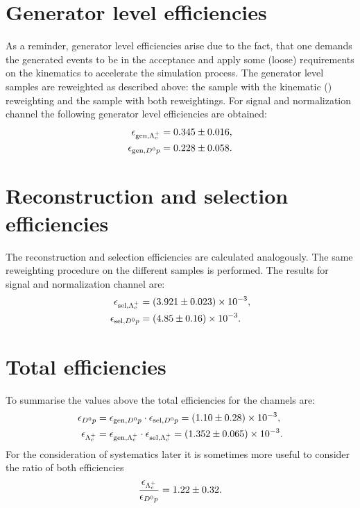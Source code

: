 \section{Generator level efficiencies}
As a reminder, generator level efficiencies arise due to the fact, that one demands the generated events to be in the \lhcb acceptance and apply some (loose) requirements on the kinematics to accelerate the simulation process.
The generator level samples are reweighted as described above: the \LbToLcmunu sample with the kinematic \pt(\Lb) reweighting and the \LbToDpmunu sample with both reweightings.
For signal and normalization channel the following generator level efficiencies are obtained:
\begin{align*}
    \effGenLc &= \effGenLcval \pm \effGenLcerr, \\
    \effGenDp &= \effGenDpval \pm \effGenDperr.
\end{align*}

\section{Reconstruction and selection efficiencies}
The reconstruction and selection efficiencies are calculated analogously.
The same reweighting procedure on the different samples is performed.
The results for signal and normalization channel are:
\begin{align*}
    \effSelLc &= \num[scientific-notation=true]{\effSelLcval \pm \effSelLcerr}, \\
    \effSelDp &= \num[scientific-notation=true]{\effSelDpval \pm \effSelDperr}.
\end{align*}

\section{Total efficiencies}
To summarise the values above the total efficiencies for the channels are:
\begin{align*}
    \effDp &= \effGenDp \cdot \effSelDp = \num[scientific-notation=true]{\effDpval \pm \effDperr}, \\
    \effLc &= \effGenLc \cdot \effSelLc = \num[scientific-notation=true]{\effLcval \pm \effLcerr}.
\end{align*}
For the consideration of systematics later it is sometimes more useful to consider the ratio of both efficiencies
\begin{align*}
    \frac{\effLc}{\effDp} = \effRatioval \pm \effRatioerr.
\end{align*}
